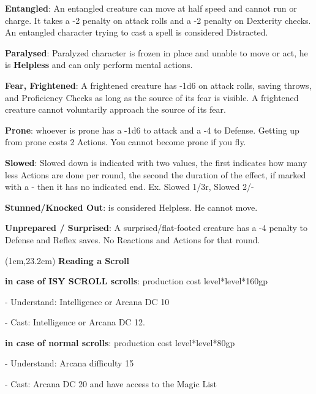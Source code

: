 \documentclass[a4paper,12 pt,openany]{book}
\begin{document}
\begin{textblock*}{19 cm}
\begin{multicols}{2}
\textbf{Entangled}: An entangled creature can move at half speed and cannot run or charge. It takes a -2 penalty on attack rolls and a -2 penalty on Dexterity checks. An entangled character trying to cast a spell is considered Distracted.

\textbf{Paralysed}:  Paralyzed character is frozen in place and unable to move or act, he is \textbf{Helpless} and can only perform mental actions.

\textbf{Fear, Frightened}: A frightened creature has -1d6 on attack rolls, saving throws, and Proficiency Checks as long as the source of its fear is visible. A frightened creature cannot voluntarily approach the source of its fear.

\textbf{Prone}: whoever is prone has a -1d6 to attack and a -4 to Defense. Getting up from prone costs 2 Actions. You cannot become prone if you fly.

\textbf{Slowed}: Slowed down is indicated with two values, the first indicates how many less Actions are done per round, the second the duration of the effect, if marked with a - then it has no indicated end. Ex. Slowed 1/3r, Slowed 2/- 

\textbf{Stunned/Knocked Out}: is considered Helpless. He cannot move.

\textbf{Unprepared / Surprised}:
A surprised/flat-footed creature has a -4 penalty to Defense and Reflex saves. No Reactions and Actions for that round.


\end{multicols}

\end{textblock*}


\begin{textblock*}{14cm}(1cm,23.2cm)
\textbf{Reading a Scroll}

\textbf{in case of ISY SCROLL scrolls}: production cost level*level*160gp

- Understand: Intelligence or Arcana DC 10

- Cast: Intelligence or Arcana DC 12.

\textbf{in case of normal scrolls}: production cost level*level*80gp

- Understand: Arcana difficulty 15

- Cast: Arcana DC 20 and have access to the Magic List
\end{textblock*}
\end{document}
